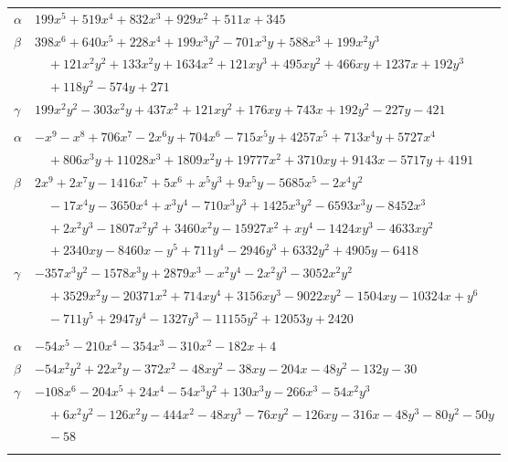 \documentclass[11pt]{article}
\begin{document}
\begin{longtable}{@{}ll@{}}
$\alpha$ & $199x^{5}+519x^{4}+832x^{3}+929x^{2}+511x+345$\\
$\beta$ & $398x^{6}+640x^{5}+228x^{4}+199x^{3}y^{2}-701x^{3}y+588x^{3}+199x^{2}y^{3}$\\
 & $\quad +121x^{2}y^{2}+133x^{2}y+1634x^{2}+121xy^{3}+495xy^{2}+466xy+1237x+192y^{3}$\\
 & $\quad +118y^{2}-574y+271$\\
$\gamma$ & $199x^{2}y^{2}-303x^{2}y+437x^{2}+121xy^{2}+176xy+743x+192y^{2}-227y-421$\\
\addlinespace[3pt]
\multicolumn{2}{@{}l}{$\{i,j\}=\{29,65\}$, $k_{ij}=5^{2}\cdot 7^{3}$}\\
$\alpha$ & $-x^{9}-x^{8}+706x^{7}-2x^{6}y+704x^{6}-715x^{5}y+4257x^{5}+713x^{4}y+5727x^{4}$\\
 & $\quad +806x^{3}y+11028x^{3}+1809x^{2}y+19777x^{2}+3710xy+9143x-5717y+4191$\\
$\beta$ & $2x^{9}+2x^{7}y-1416x^{7}+5x^{6}+x^{5}y^{3}+9x^{5}y-5685x^{5}-2x^{4}y^{2}$\\
 & $\quad -17x^{4}y-3650x^{4}+x^{3}y^{4}-710x^{3}y^{3}+1425x^{3}y^{2}-6593x^{3}y-8452x^{3}$\\
 & $\quad +2x^{2}y^{3}-1807x^{2}y^{2}+3460x^{2}y-15927x^{2}+xy^{4}-1424xy^{3}-4633xy^{2}$\\
 & $\quad +2340xy-8460x-y^{5}+711y^{4}-2946y^{3}+6332y^{2}+4905y-6418$\\
$\gamma$ & $-357x^{3}y^{2}-1578x^{3}y+2879x^{3}-x^{2}y^{4}-2x^{2}y^{3}-3052x^{2}y^{2}$\\
 & $\quad +3529x^{2}y-20371x^{2}+714xy^{4}+3156xy^{3}-9022xy^{2}-1504xy-10324x+y^{6}$\\
 & $\quad -711y^{5}+2947y^{4}-1327y^{3}-11155y^{2}+12053y+2420$\\
\addlinespace[3pt]
\multicolumn{2}{@{}l}{$\{i,j\}=\{29,78\}$, $k_{ij}=2\cdot 7^{2}$}\\
$\alpha$ & $-54x^{5}-210x^{4}-354x^{3}-310x^{2}-182x+4$\\
$\beta$ & $-54x^{2}y^{2}+22x^{2}y-372x^{2}-48xy^{2}-38xy-204x-48y^{2}-132y-30$\\
$\gamma$ & $-108x^{6}-204x^{5}+24x^{4}-54x^{3}y^{2}+130x^{3}y-266x^{3}-54x^{2}y^{3}$\\
 & $\quad +6x^{2}y^{2}-126x^{2}y-444x^{2}-48xy^{3}-76xy^{2}-126xy-316x-48y^{3}-80y^{2}-50y$\\
 & $\quad -58$\\
\addlinespace[3pt]
\multicolumn{2}{@{}l}{$\{i,j\}=\{29,150\}$, $k_{ij}=2^{3}\cdot 3^{2}\cdot 7^{3}$}\\

\end{longtable}
\end{document}
